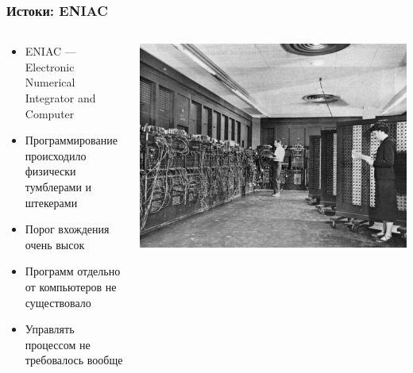 \documentclass{../../slides-style}
\begin{document}
    \begin{frame}
        \frametitle{Истоки: ENIAC}
        \begin{columns}
            \begin{column}{0.5\textwidth}
                \begin{itemize}
                    \item ENIAC --- Electronic Numerical Integrator and Computer 
                    \item Программирование происходило физически тумблерами и штекерами
                    \item Порог вхождения очень высок
                    \item Программ отдельно от компьютеров не существовало
                    \item Управлять процессом не требовалось вообще
                \end{itemize}
            \end{column}
            \begin{column}{0.5\textwidth}
                \begin{center}
                    \includegraphics[width=\textwidth]{eniac.png}
                \end{center}
            \end{column}
        \end{columns}
    \end{frame}
\end{document}
